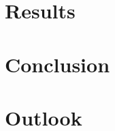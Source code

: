 \documentclass[draft]{fhnwreport}       %
\begin{document}
\section{Results}
\section{Conclusion}
\section{Outlook}

\newpage
{\sloppypar
\printbibliography
\label{sec:lit}
}

{%
}
\end{document}
